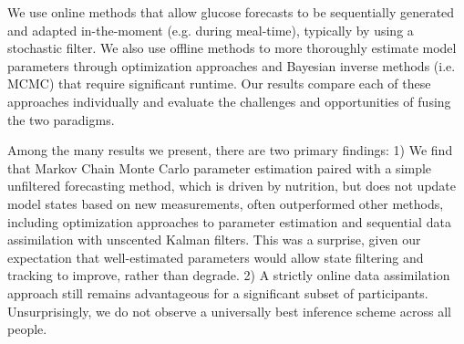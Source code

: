 \documentclass[10pt,letterpaper]{article}
\begin{document}

We use online methods that allow glucose forecasts to be sequentially generated and adapted in-the-moment (e.g. during meal-time), typically by using a stochastic filter. We also use offline methods to more thoroughly estimate model parameters through optimization approaches and Bayesian inverse methods (i.e. MCMC) that require significant runtime. 
Our results compare each of these approaches individually and evaluate the challenges and opportunities of fusing the two paradigms.
 
Among the many results we present, there are two primary findings: 1) We find that Markov Chain Monte Carlo parameter estimation paired with a simple unfiltered forecasting method, which is driven by nutrition, but does not update model states based on new measurements, often outperformed other methods, including optimization approaches to parameter estimation and sequential data assimilation with unscented Kalman filters. This was a surprise, given our expectation that well-estimated parameters would allow state filtering and tracking to improve, rather than degrade. 2) A strictly online data assimilation approach still remains advantageous for a significant subset of participants. Unsurprisingly, we do not observe a universally best inference scheme across all people.




\end{document}
